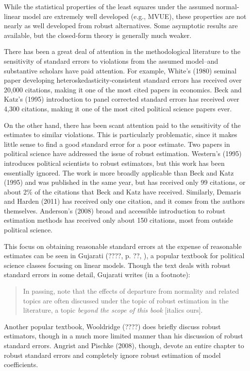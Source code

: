\documentclass[12pt]{article}
\begin{document}
While the statistical properties of the least squares under the assumed normal-linear model are extremely well developed (e.g., MVUE), these properties are not nearly as well developed from robust alternatives. Some asymptotic results are available, but the closed-form theory is generally much weaker.

There has been a great deal of attention in the methodological literature to the sensitivity of standard errors to violations from the assumed model--and substantive scholars have paid attention. For example, White's (1980) seminal paper developing heteroskedasticity-consistent standard errors has received over 20,000 citations, making it one of the most cited papers in economics. Beck and Katz's (1995) introduction to panel corrected standard errors has received over 4,300 citations, making it one of the most cited political science papers ever.

On the other hand, there has been scant attention paid to the sensitivity of the estimates to similar violations. This is particularly problematic, since it makes little sense to find a good standard error for a poor estimate. Two papers in political science have addressed the issue of robust estimation. Western's (1995) introduces political scientists to robust estimators, but this work has been essentially ignored. The work is more broadly applicable than Beck and Katz (1995) and was published in the same year, but has received only 99 citations, or  about 2\% of the citations that Beck and Katz have received. Similarly, Demaris and Harden (2011) has received only one citation, and it comes from the authors themselves. Anderson's (2008) broad and accessible introduction to robust estimation methods has received only about 150 citations, most from outside political science.

This focus on obtaining reasonable standard errors at the expense of reasonable estimates can be seen in Gujarati (????, p. ??, ), a popular textbook for political science classes focusing on linear models. Though the text deals with robust standard errors in some detail, Gujarati writes (in a footnote):
\begin{quote}
In passing, note that the effects of departure from normality and related topics are often discussed under the topic of robust estimation in the literature, a topic \textit{beyond the scope of this book} [italics ours].
\end{quote}
Another popular textbook, Wooldridge (????) does briefly discuss robust estimators, though in a much more limited manner than his discussion of robust standard errors. Angrist and Pischke (2008), though, devote an entire chapter to robust standard errors and completely ignore robust estimation of model coefficients.
\end{document}
